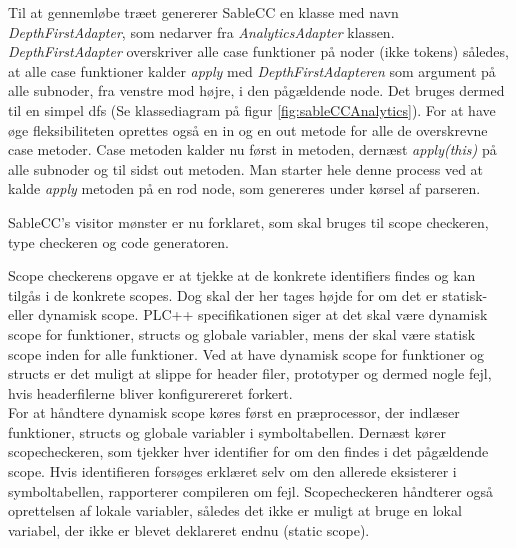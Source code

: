 Til at gennemløbe træet genererer SableCC en klasse med navn \textit{DepthFirstAdapter}, som nedarver fra \textit{AnalyticsAdapter} klassen. \textit{DepthFirstAdapter} overskriver alle case funktioner på noder (ikke tokens) således, at alle case funktioner kalder \textit{apply} med \textit{DepthFirstAdapteren} som argument på alle subnoder, fra venstre mod højre, i den pågældende node. Det bruges dermed til en simpel \gls{dfs} (Se klassediagram på figur \ref{fig:sableCCAnalytics}). For at have øge fleksibiliteten oprettes også en in og en out metode for alle de overskrevne case metoder. Case metoden kalder nu først in metoden, dernæst \textit{apply(this)} på alle subnoder og til sidst out metoden. Man starter hele denne process ved at kalde \textit{apply} metoden på en rod node, som genereres under kørsel af parseren.

\bigskip



\noindent SableCC's visitor mønster er nu forklaret, som skal bruges til scope checkeren, type checkeren og code generatoren.

Scope checkerens opgave er at tjekke at de konkrete identifiers findes og kan tilgås i de konkrete scopes. Dog skal der her tages højde for om det er statisk- eller dynamisk scope. PLC++ specifikationen siger at det skal være dynamisk scope for funktioner, structs og globale variabler, mens der skal være statisk scope inden for alle funktioner. Ved at have dynamisk scope for funktioner og structs er det muligt at slippe for header filer, prototyper og dermed nogle fejl, hvis headerfilerne bliver konfigurereret forkert.\\

\noindent For at håndtere dynamisk scope køres først en præprocessor, der indlæser funktioner, structs og globale variabler i symboltabellen. Dernæst kører scopecheckeren, som tjekker hver  identifier for om den findes i det pågældende scope. Hvis identifieren forsøges erklæret selv om den allerede eksisterer i symboltabellen, rapporterer compileren om fejl. Scopecheckeren håndterer også oprettelsen af lokale variabler, således det ikke er muligt at bruge en lokal variabel, der ikke er blevet deklareret endnu (static scope).\\

